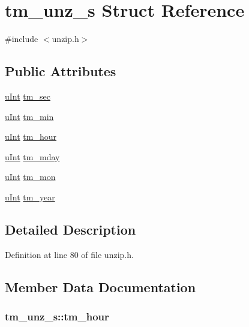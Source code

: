 \hypertarget{structtm__unz__s}{\section{tm\-\_\-unz\-\_\-s Struct Reference}
\label{structtm__unz__s}
}


{\ttfamily \#include $<$unzip.\-h$>$}

\subsection*{Public Attributes}
\begin{DoxyCompactItemize}
\item 
\hyperlink{zconf_8h_a87d141052bcd5ec8a80812a565c70369}{u\-Int} \hyperlink{structtm__unz__s_ab91e69a9869e5db5be51b1aebaa5ea0d}{tm\-\_\-sec}
\item 
\hyperlink{zconf_8h_a87d141052bcd5ec8a80812a565c70369}{u\-Int} \hyperlink{structtm__unz__s_ac5a6bf08a4c5db8ae2243d4f0c35b192}{tm\-\_\-min}
\item 
\hyperlink{zconf_8h_a87d141052bcd5ec8a80812a565c70369}{u\-Int} \hyperlink{structtm__unz__s_ada09255f794d6c2db07ef73b77266b9c}{tm\-\_\-hour}
\item 
\hyperlink{zconf_8h_a87d141052bcd5ec8a80812a565c70369}{u\-Int} \hyperlink{structtm__unz__s_a51ed1873e1dcabf08ff0f85caf8aefee}{tm\-\_\-mday}
\item 
\hyperlink{zconf_8h_a87d141052bcd5ec8a80812a565c70369}{u\-Int} \hyperlink{structtm__unz__s_a4f5e461d8cad18d1aff7ec012168111d}{tm\-\_\-mon}
\item 
\hyperlink{zconf_8h_a87d141052bcd5ec8a80812a565c70369}{u\-Int} \hyperlink{structtm__unz__s_a5f17147e3cfbbfdbeb2e29cbc1df8136}{tm\-\_\-year}
\end{DoxyCompactItemize}


\subsection{Detailed Description}


Definition at line 80 of file unzip.\-h.



\subsection{Member Data Documentation}
\hypertarget{structtm__unz__s_ada09255f794d6c2db07ef73b77266b9c}{
\subsubsection[{tm\-\_\-hour}]{ tm\-\_\-unz\-\_\-s\-::tm\-\_\-hour}}\label{structtm__unz__s_ada09255f794d6c2db07ef73b77266b9c}


